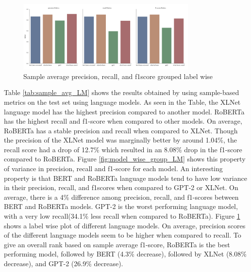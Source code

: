 \begin{figure}[h!]
    \centering
    \includegraphics[width=0.8\textwidth]{thesis/figures/labelwise_wise_prf.png}
    \caption{Sample average precision, recall, and f1score grouped label wise }
    \label{fig:label_wise_group_LM}
\end{figure}
Table \ref{tab:sample_avg_LM} shows the results obtained by using sample-based metrics on the test set using language models. As seen in the Table, the XLNet language model has the highest precision compared to another model.  RoBERTa has the highest recall and f1-score when compared to other models. On average, RoBERTa has a stable precision and recall when compared to XLNet. Though the precision of the XLNet model was marginally better by around 1.04\%, the recall score had a drop of 12.7\%  which resulted in an 8.08\% drop in the f1-score compared to RoBERTa. Figure \ref{fig:model_wise_group_LM} shows this property of variance in precision, recall and f1-score for each model. An interesting property is that BERT and RoBERTa language models tend to have low variance in their precision, recall, and f1scores when compared to GPT-2 or XLNet. On average, there is a 4\% difference among precision, recall, and f1-scores between BERT and RoBERTa models. GPT-2 is the worst performing language model, with a very low recall(34.1\% less recall when compared to RoBERTa). Figure \ref{fig:label_wise_group_LM} shows a label wise plot of different language models. On average, precision scores of the different language models seem to be higher when compared to recall. To give an overall rank based on sample average f1-score, RoBERTa is the best performing model, followed by BERT (4.3\% decrease), followed by XLNet (8.08\% decrease), and GPT-2 (26.9\% decrease). 



